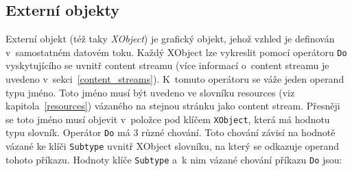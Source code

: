 \subsection*{Externí objekty} \label{XObject}
Externí objekt (též taky \emph{XObject}) je grafický objekt, jehož vzhled
je definován v~samostatném datovém toku.
Každý XObject lze vykreslit pomocí operátoru \texttt{Do} vyskytujícího se uvnitř
content streamu (více informací o~content streamu je uvedeno 
v~sekci~\ref{content_streams}). K~tomuto operátoru se váže jeden operand typu 
jméno. Toto jméno
musí být uvedeno ve slovníku resources (viz kapitola~\ref{resources}) vázaného
na stejnou stránku jako content stream. Přesněji se toto jméno musí objevit
v~položce pod klíčem \texttt{XObject}, která má hodnotu typu slovník. Operátor
\texttt{Do} má 3 různé chování. Toto chování závisí na hodnotě vázané ke klíči
\texttt{Subtype} uvnitř XObject slovníku, na který se odkazuje operand tohoto
příkazu. Hodnoty klíče \texttt{Subtype} a~k nim vázané chování příkazu
\texttt{Do} jsou:
